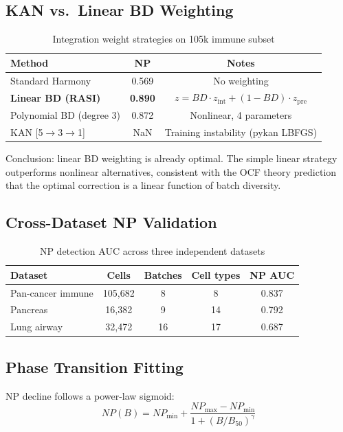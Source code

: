 \documentclass[10pt]{article}
\begin{document}
\subsection{KAN vs.\ Linear BD Weighting}

\begin{table}[H]
\centering
\caption{Integration weight strategies on 105k immune subset}
\begin{tabular}{lcc}
\toprule
Method & NP & Notes \\
\midrule
Standard Harmony & 0.569 & No weighting \\
\textbf{Linear BD (RASI)} & \textbf{0.890} & $z = BD \cdot z_{\text{int}} + (1-BD) \cdot z_{\text{pre}}$ \\
Polynomial BD (degree 3) & 0.872 & Nonlinear, 4 parameters \\
KAN [5$\to$3$\to$1] & NaN & Training instability (pykan LBFGS) \\
\bottomrule
\end{tabular}
\end{table}

Conclusion: linear BD weighting is already optimal. The simple linear strategy outperforms nonlinear alternatives, consistent with the OCF theory prediction that the optimal correction is a linear function of batch diversity.

\subsection{Cross-Dataset NP Validation}

\begin{table}[H]
\centering
\caption{NP detection AUC across three independent datasets}
\begin{tabular}{lcccc}
\toprule
Dataset & Cells & Batches & Cell types & NP AUC \\
\midrule
Pan-cancer immune & 105,682 & 8 & 8 & 0.837 \\
Pancreas & 16,382 & 9 & 14 & 0.792 \\
Lung airway & 32,472 & 16 & 17 & 0.687 \\
\bottomrule
\end{tabular}
\end{table}

\subsection{Phase Transition Fitting}

NP decline follows a power-law sigmoid:
$$NP(B) = NP_{\min} + \frac{NP_{\max} - NP_{\min}}{1 + (B/B_{50})^\gamma}$$
\end{document}
